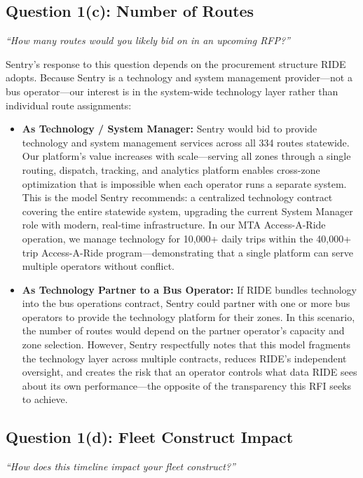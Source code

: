 \subsection{Question 1(c): Number of Routes}
\textit{``How many routes would you likely bid on in an upcoming RFP?''}

\vspace{0.3cm}

Sentry's response to this question depends on the procurement structure RIDE adopts. Because Sentry is a technology and system management provider---not a bus operator---our interest is in the system-wide technology layer rather than individual route assignments:

\begin{itemize}
    \item \textbf{As Technology / System Manager:} Sentry would bid to provide technology and system management services across all 334 routes statewide. Our platform's value increases with scale---serving all zones through a single routing, dispatch, tracking, and analytics platform enables cross-zone optimization that is impossible when each operator runs a separate system. This is the model Sentry recommends: a centralized technology contract covering the entire statewide system, upgrading the current System Manager role with modern, real-time infrastructure. In our MTA Access-A-Ride operation, we manage technology for 10,000+ daily trips within the 40,000+ trip Access-A-Ride program---demonstrating that a single platform can serve multiple operators without conflict.
    \item \textbf{As Technology Partner to a Bus Operator:} If RIDE bundles technology into the bus operations contract, Sentry could partner with one or more bus operators to provide the technology platform for their zones. In this scenario, the number of routes would depend on the partner operator's capacity and zone selection. However, Sentry respectfully notes that this model fragments the technology layer across multiple contracts, reduces RIDE's independent oversight, and creates the risk that an operator controls what data RIDE sees about its own performance---the opposite of the transparency this RFI seeks to achieve.
\end{itemize}

\subsection{Question 1(d): Fleet Construct Impact}
\textit{``How does this timeline impact your fleet construct?''}

